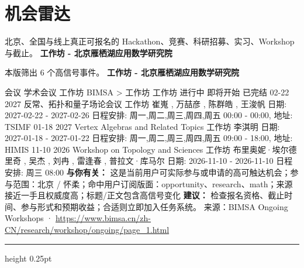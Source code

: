 \documentclass[10.5pt]{ctexart}
\begin{document}
\section*{机会雷达}
{\color{ormuted} 北京、全国与线上真正可报名的 Hackathon、竞赛、科研招募、实习、Workshop 与截止。}
\vspace{2mm}
{\LARGE\bfseries 工作坊 - 北京雁栖湖应用数学研究院}\par
\vspace{1mm}
{\color{ormuted} 本版筛出 6 个高信号事件。}
\vspace{3mm}
{\Large\bfseries 工作坊 - 北京雁栖湖应用数学研究院}\par
会议 学术会议 工作坊 BIMSA > 工作坊 工作坊 进行中 即将开始 已完结 02-22 2027 反常、拓扑和量子场论会议 工作坊 崔嵬 , 万喆彦 , 陈群皓 , 王浚帆 日期: 2027-02-22 - 2027-02-26 日程安排: 周一,周二,周三,周四,周五 00:00 - 00:00, 地址: TSIMF 01-18 2027 Vertex Algebras and Related Topics 工作坊 李淇明 日期: 2027-01-18 - 2027-01-22 日程安排: 周一,周二,周三,周四,周五 09:00 - 18:00, 地址: HIMIS 11-10 2026 Workshop on Topology and Sciences 工作坊 布里奥妮·埃尔德里奇 , 吴杰 , 刘冉 , 雷逢春 , 普拉文·库马尔 日期: 2026-11-10 - 2026-11-10 日程安排: 周三 08:00
\textbf{与你有关：} 这是当前用户可实际参与或申请的高可触达机会；参与范围：北京 / 怀柔；命中用户订阅版面：opportunity、research、math；来源接近一手且权威度高；标题/正文包含高信号变化
\textbf{建议：} 检查报名资格、截止时间、参与形式和预期收益；合适则立即加入任务系统。
{\footnotesize\color{ormuted} 来源：BIMSA Ongoing Workshops · \url{https://www.bimsa.cn/zh-CN/research/workshop/ongoing/page_1.html}}
\vspace{4mm}
\hrule height 0.25pt
\vspace{3mm}
\end{document}
